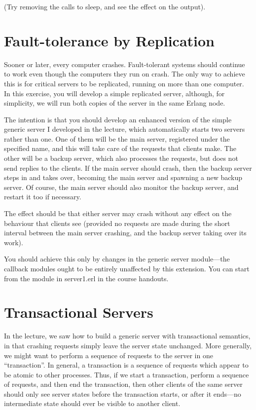 \documentclass{article}
\begin{document}
(Try removing the calls to sleep, and see the effect on the output).

\section{Fault-tolerance by Replication}

Sooner or later, every computer crashes. Fault-tolerant systems should
continue to work even though the computers they run on crash. The only
way to achieve this is for critical servers to be replicated, running
on more than one computer. In this exercise, you will develop a simple
replicated server, although, for simplicity, we will run both copies
of the server in the same Erlang node.

The intention is that you should develop an enhanced version of the
simple generic server I developed in the lecture, which automatically
starts two servers rather than one. One of them will be the main
server, registered under the specified name, and this will take care
of the requests that clients make. The other will be a backup server,
which also processes the requests, but does not send replies to the
clients. If the main server should crash, then the backup server steps
in and takes over, becoming the main server and spawning a new backup
server. Of course, the main server should also monitor the backup
server, and restart it too if necessary.

The effect should be that either server may crash without any effect
on the behaviour that clients see (provided no requests are made
during the short interval between the main server crashing, and the
backup server taking over its work).

You should achieve this only by changes in the generic server
module—the callback modules ought to be entirely unaffected by this
extension. You can start from the module in \textsf{server1.erl} in
the course handouts.

\section{Transactional Servers}
In the lecture, we saw how to build a generic server with transactional semantics, in that crashing requests simply leave the server state unchanged. More generally, we might want to perform a sequence of requests to the server in one “transaction”. In general, a transaction is a sequence of requests which appear to be atomic to other processes. Thus, if we start a transaction, perform a sequence of requests, and then end the transaction, then other clients of the same server should only see server states before the transaction starts, or after it ends—no intermediate state should ever be visible to another client.
\end{document}
